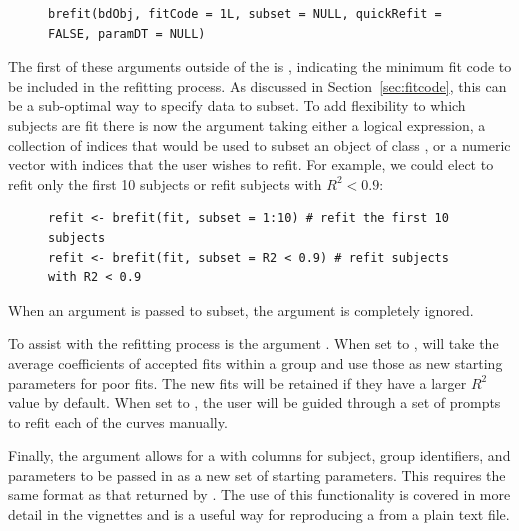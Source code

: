 \begin{singlespace}
\begin{figure}[H]
\centering
\begin{BVerbatim}
brefit(bdObj, fitCode = 1L, subset = NULL, quickRefit = FALSE, paramDT = NULL)
\end{BVerbatim}
\end{figure}
\end{singlespace}

The first of these arguments outside of the  is , indicating the minimum fit code to be included in the refitting process. As discussed in Section~\ref{sec:fitcode}, this can be a sub-optimal way to specify data to subset. To add flexibility to which subjects are fit there is now the  argument taking either a logical expression, a collection of indices that would be used to subset an object of class , or a numeric vector with indices that the user wishes to refit. For example, we could elect to refit only the first 10 subjects or refit subjects with $R^2 < 0.9$:

\begin{singlespace}
\begin{figure}[H]
\centering
\begin{BVerbatim}
refit <- brefit(fit, subset = 1:10) # refit the first 10 subjects
refit <- brefit(fit, subset = R2 < 0.9) # refit subjects with R2 < 0.9
\end{BVerbatim}
\end{figure}
\end{singlespace}

When an argument is passed to subset, the  argument is completely ignored.

To assist with the refitting process is the argument . When set to ,  will take the average coefficients of accepted fits within a group and use those as new starting parameters for poor fits. The new fits will be retained if they have a larger $R^2$ value by default. When set to , the user will be guided through a set of prompts to refit each of the curves manually. 

Finally, the  argument allows for a  with columns for subject, group identifiers, and parameters to be passed in as a new set of starting parameters. This  requires the same format as that returned by . The use of this functionality is covered in more detail in the  vignettes and is a useful way for reproducing a  from a plain text file. 


